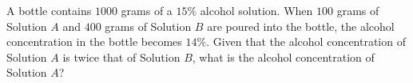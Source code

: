 A bottle contains $1000$ grams of a $15\%$ alcohol solution. When $100$ grams of Solution $A$ and $400$ grams of Solution $B$ are poured into the bottle, the alcohol concentration in the bottle becomes $14\%$. Given that the alcohol concentration of Solution $A$ is twice that of Solution $B$, what is the alcohol concentration of Solution $A$?
